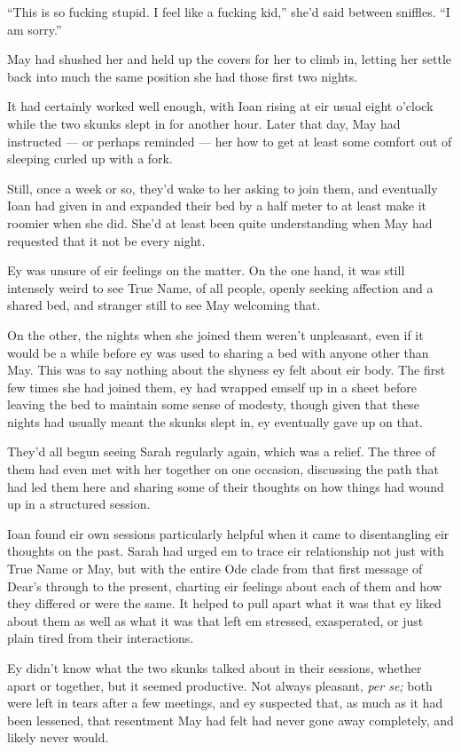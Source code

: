 ``This is so fucking stupid. I feel like a fucking kid,'' she'd said between sniffles. ``I am sorry.''

May had shushed her and held up the covers for her to climb in, letting her settle back into much the same position she had those first two nights.

It had certainly worked well enough, with Ioan rising at eir usual eight o'clock while the two skunks slept in for another hour. Later that day, May had instructed — or perhaps reminded — her how to get at least some comfort out of sleeping curled up with a fork.

Still, once a week or so, they'd wake to her asking to join them, and eventually Ioan had given in and expanded their bed by a half meter to at least make it roomier when she did. She'd at least been quite understanding when May had requested that it not be every night.

Ey was unsure of eir feelings on the matter. On the one hand, it was still intensely weird to see True Name, of all people, openly seeking affection and a shared bed, and stranger still to see May welcoming that.

On the other, the nights when she joined them weren't unpleasant, even if it would be a while before ey was used to sharing a bed with anyone other than May. This was to say nothing about the shyness ey felt about eir body. The first few times she had joined them, ey had wrapped emself up in a sheet before leaving the bed to maintain some sense of modesty, though given that these nights had usually meant the skunks slept in, ey eventually gave up on that.

They'd all begun seeing Sarah regularly again, which was a relief. The three of them had even met with her together on one occasion, discussing the path that had led them here and sharing some of their thoughts on how things had wound up in a structured session.

Ioan found eir own sessions particularly helpful when it came to disentangling eir thoughts on the past. Sarah had urged em to trace eir relationship not just with True Name or May, but with the entire Ode clade from that first message of Dear's through to the present, charting eir feelings about each of them and how they differed or were the same. It helped to pull apart what it was that ey liked about them as well as what it was that left em stressed, exasperated, or just plain tired from their interactions.

Ey didn't know what the two skunks talked about in their sessions, whether apart or together, but it seemed productive. Not always pleasant, \emph{per se;} both were left in tears after a few meetings, and ey suspected that, as much as it had been lessened, that resentment May had felt had never gone away completely, and likely never would.


